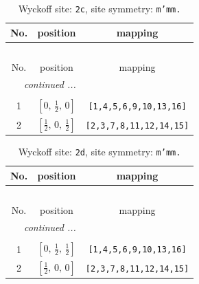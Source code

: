 \documentclass[fleqn,8pt]{jsarticle}
\begin{document}
\renewcommand{\arraystretch}{1.2}
\begin{longtable}{ccc}
\caption{Wyckoff site: {\tt 2c}, site symmetry: {\tt m'mm.}}
 \\
 \hline \hline
No. & position & mapping \\ \hline \endfirsthead

\multicolumn{2}{l}{\tablename\ \thetable{}} \\
 \hline \hline
No. & position & mapping \\ \hline \endhead

 \hline \hline
\multicolumn{2}{r}{\footnotesize\it continued ...} \\ \endfoot

 \hline \hline
\multicolumn{2}{r}{} \\ \endlastfoot

1 & $\left[ 0,\, \frac{1}{2},\, 0 \right]$ & {\tt [1,4,5,6,9,10,13,16]} \\ \hline
2 & $\left[ \frac{1}{2},\, 0,\, \frac{1}{2} \right]$ & {\tt [2,3,7,8,11,12,14,15]} \\
\end{longtable}
\renewcommand{\arraystretch}{1.2}
\begin{longtable}{ccc}
\caption{Wyckoff site: {\tt 2d}, site symmetry: {\tt m'mm.}}
 \\
 \hline \hline
No. & position & mapping \\ \hline \endfirsthead

\multicolumn{2}{l}{\tablename\ \thetable{}} \\
 \hline \hline
No. & position & mapping \\ \hline \endhead

 \hline \hline
\multicolumn{2}{r}{\footnotesize\it continued ...} \\ \endfoot

 \hline \hline
\multicolumn{2}{r}{} \\ \endlastfoot

1 & $\left[ 0,\, \frac{1}{2},\, \frac{1}{2} \right]$ & {\tt [1,4,5,6,9,10,13,16]} \\ \hline
2 & $\left[ \frac{1}{2},\, 0,\, 0 \right]$ & {\tt [2,3,7,8,11,12,14,15]} \\
\end{longtable}
\renewcommand{\arraystretch}{1.2}
\end{document}
